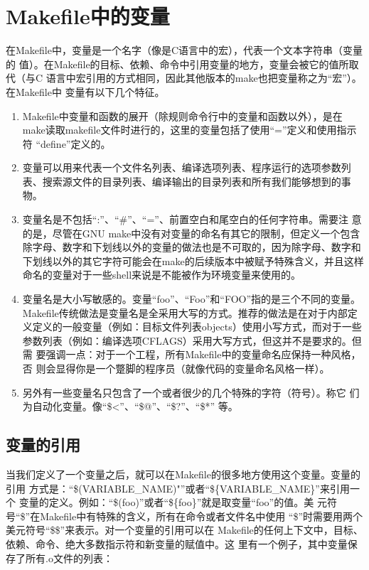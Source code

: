 ﻿\chapter{Makefile中的变量}

在Makefile中，变量是一个名字（像是C语言中的宏），代表一个文本字符串（变量的
值）。在Makefile的目标、依赖、命令中引用变量的地方，变量会被它的值所取代（与C
语言中宏引用的方式相同，因此其他版本的make也把变量称之为“宏”）。在Makefile中
变量有以下几个特征。

\begin{enumerate}
\itemsep=4pt \parskip=0pt
  \item Makefile中变量和函数的展开（除规则命令行中的变量和函数以外），是在
      make读取makefile文件时进行的，这里的变量包括了使用“=”定义和使用指示符
      “define”定义的。
  \item 变量可以用来代表一个文件名列表、编译选项列表、程序运行的选项参数列
      表、搜索源文件的目录列表、编译输出的目录列表和所有我们能够想到的事
      物。
  \item 变量名是不包括“:”、“\#”、“=”、前置空白和尾空白的任何字符串。需要注
      意的是，尽管在GNU make中没有对变量的命名有其它的限制，但定义一个包含
      除字母、数字和下划线以外的变量的做法也是不可取的，因为除字母、数字和
      下划线以外的其它字符可能会在make的后续版本中被赋予特殊含义，并且这样
      命名的变量对于一些shell来说是不能被作为环境变量来使用的。
  \item 变量名是大小写敏感的。变量“foo”、“Foo”和“FOO”指的是三个不同的变量。
      Makefile传统做法是变量名是全采用大写的方式。推荐的做法是在对于内部定
      义定义的一般变量（例如：目标文件列表objects）使用小写方式，而对于一些
      参数列表（例如：编译选项CFLAGS）采用大写方式，但这并不是要求的。但需
      要强调一点：对于一个工程，所有Makefile中的变量命名应保持一种风格，否
      则会显得你是一个蹩脚的程序员（就像代码的变量命名风格一样）。
  \item 另外有一些变量名只包含了一个或者很少的几个特殊的字符（符号）。称它
      们为自动化变量。像“\$<”、“\$@”、“\$?”、“\$*”
      等。
\end{enumerate}

\section{变量的引用}
当我们定义了一个变量之后，就可以在Makefile的很多地方使用这个变量。变量的引用
方式是：“\$(VARIABLE\_NAME)"”或者“\$\{VARIABLE\_NAME\}”来引用一个
变量的定义。例如：“\$(foo)”或者“\$\{foo\}”就是取变量“foo”的值。美
元符号“\$”在Makefile中有特殊的含义，所有在命令或者文件名中使用
“\$”时需要用两个美元符号“\$\$”来表示。对一个变量的引用可以在
Makefile的任何上下文中，目标、依赖、命令、绝大多数指示符和新变量的赋值中。这
里有一个例子，其中变量保存了所有.o文件的列表：


